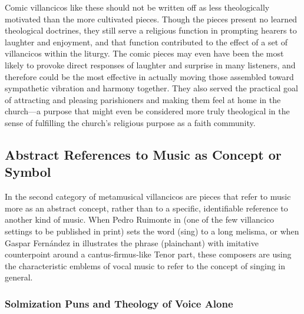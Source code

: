 Comic villancicos like these should not be written off as less theologically
motivated than the more cultivated pieces.
Though the  pieces present no learned theological
doctrines, they still serve a religious function in prompting hearers to
laughter and enjoyment, and that function contributed to the effect of a set of
villancicos within the liturgy.
The comic pieces may even have been the most likely to provoke direct responses
of laughter and surprise in many listeners, and therefore could be the most
effective in actually moving those assembled toward sympathetic vibration and
harmony together. 
They also served the practical goal of attracting and pleasing parishioners and
making them feel at home in the church---a purpose that might even be
considered more truly theological in the sense of fulfilling the church's
religious purpose as a faith community.

\subsection{Abstract References to Music as Concept or Symbol}

In the second category of metamusical villancicos are pieces that refer to
music more as an abstract concept, rather than to a specific, identifiable
reference to another kind of music.
When Pedro Ruimonte in  (one of the few villancico
settings to be published in print) sets the word  (sing) to a
long melisma, or when Gaspar Fernández in 
illustrates the phrase  (plainchant) with imitative
counterpoint around a cantus-firmus-like Tenor part, these composers are using
the characteristic emblems of vocal music to refer to the concept of singing in
general.%
    \Autocites
    {Ruimonte:Parnaso}
    {Fernandez:Cancionero}
    [for crucial emendations to the latter composer's biography, see][]
    {Morales:Fernandez}

\subsubsection{Solmization Puns and Theology of Voice Alone}

